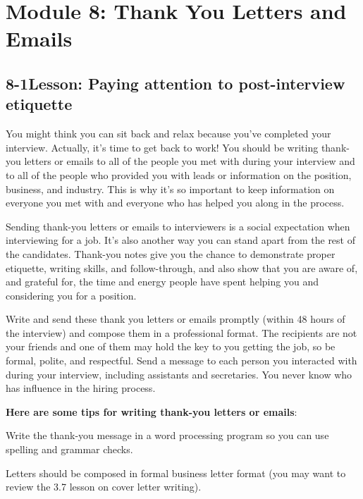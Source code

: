 \pagebreak \section*{Module 8:	Thank You Letters and Emails}
\noindent\makebox[\textwidth]{\rule{\linewidth}{0.4pt}}  \localtableofcontents 
\noindent\makebox[\textwidth]{\rule{\linewidth}{0.4pt}} 


\pagebreak \subsection*{8-1\quad Lesson: Paying attention to post-interview etiquette}
You might think you can sit back and relax because you’ve completed your interview. Actually, it's time to get back to work! You should be writing thank-you letters or emails to all of the people you met with during your interview and to all of the people who provided you with leads or information on the position, business, and industry. This is why it's so important to keep information on everyone you met with and everyone who has helped you along in the process.

Sending thank-you letters or emails to interviewers is a social expectation when interviewing for a job. It's also another way you can stand apart from the rest of the candidates. Thank-you notes give you the chance to demonstrate proper etiquette, writing skills, and follow-through, and also show that you are aware of, and grateful for, the time and energy people have spent helping you and considering you for a position.

Write and send these thank you letters or emails promptly (within 48 hours of the interview) and compose them in a professional format. The recipients are not your friends and one of them may hold the key to you getting the job, so be formal, polite, and respectful. Send a message to each person you interacted with during your interview, including assistants and secretaries. You never know who has influence in the hiring process.

\textbf{Here are some tips for writing thank-you letters or emails}:

Write the thank-you message in a word processing program so you can use spelling and grammar checks.

Letters should be composed in formal business letter format (you may want to review the 3.7 lesson on cover letter writing).

